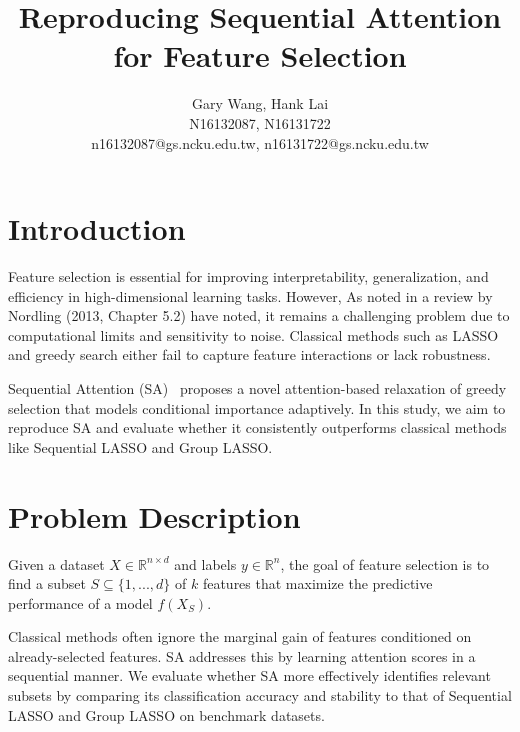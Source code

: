 \documentclass[a4paper,twocolumn]{article} %
\begin{document}

\title{Reproducing Sequential Attention for Feature Selection}
\author{Gary Wang, Hank Lai \\ N16132087, N16131722 \\ n16132087@gs.ncku.edu.tw, n16131722@gs.ncku.edu.tw} 

\maketitle                     %





\section{Introduction}

Feature selection is essential for improving interpretability, generalization, and efficiency in high-dimensional learning tasks.
 However, As noted in a review by Nordling (2013, Chapter 5.2) have noted, it remains a challenging problem due to 
computational limits and sensitivity to noise. Classical methods such as LASSO and greedy search either fail to capture feature interactions or lack robustness.

Sequential Attention (SA)~\cite{yasuda2023} proposes a novel attention-based relaxation of greedy selection that models conditional importance adaptively. 
In this study, we aim to reproduce SA and evaluate whether it consistently outperforms classical methods 
like Sequential LASSO and Group LASSO.


\section{Problem Description}

Given a dataset $X \in \mathbb{R}^{n \times d}$ and labels $y \in \mathbb{R}^n$, the goal of feature selection is to find a subset $S \subseteq \{1, ..., d\}$ of $k$ features that maximize the predictive performance of a model $f(X_S)$.

Classical methods often ignore the marginal gain of features conditioned on already-selected features.
 SA addresses this by learning attention scores in a sequential manner. We evaluate whether SA more effectively 
identifies relevant subsets by comparing its classification accuracy and stability to that of Sequential LASSO and Group LASSO on benchmark datasets.
\end{document}
